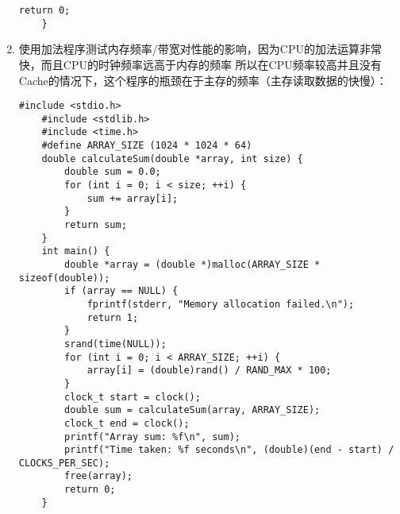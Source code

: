 \documentclass{article}
\begin{document}
\begin{enumerate}
\begin{lstlisting}[style=cstyle]
        return 0;
    }
  \end{lstlisting}
  \item 使用加法程序测试内存频率/带宽对性能的影响，因为CPU的加法运算非常快，而且CPU的时钟频率远高于内存的频率
  所以在CPU频率较高并且没有Cache的情况下，这个程序的瓶颈在于主存的频率（主存读取数据的快慢）：
  \begin{lstlisting}[style=cstyle]
    #include <stdio.h>
    #include <stdlib.h>
    #include <time.h>
    #define ARRAY_SIZE (1024 * 1024 * 64) 
    double calculateSum(double *array, int size) {
        double sum = 0.0;
        for (int i = 0; i < size; ++i) {
            sum += array[i];
        }
        return sum;
    }
    int main() {
        double *array = (double *)malloc(ARRAY_SIZE * sizeof(double));
        if (array == NULL) {
            fprintf(stderr, "Memory allocation failed.\n");
            return 1;
        }
        srand(time(NULL));
        for (int i = 0; i < ARRAY_SIZE; ++i) {
            array[i] = (double)rand() / RAND_MAX * 100;
        }
        clock_t start = clock();
        double sum = calculateSum(array, ARRAY_SIZE);
        clock_t end = clock();
        printf("Array sum: %f\n", sum);
        printf("Time taken: %f seconds\n", (double)(end - start) / CLOCKS_PER_SEC);
        free(array);
        return 0;
    }
  \end{lstlisting}
\end{enumerate}
\end{document}
